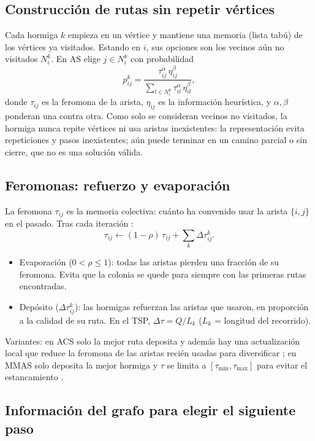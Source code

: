 \subsection{Construcción de rutas sin repetir vértices}

Cada hormiga $k$ empieza en un vértice y mantiene una memoria (lista tabú) de los
vértices ya visitados. Estando en $i$, sus opciones son los vecinos aún no visitados
$N_i^k$. En AS elige $j\in N_i^k$ con probabilidad \cite{aco1,aco3}
\[
  p_{ij}^{k}=\frac{\tau_{ij}^{\alpha}\,\eta_{ij}^{\beta}}
                  {\sum_{l\in N_i^k}\tau_{il}^{\alpha}\,\eta_{il}^{\beta}},
\]
donde $\tau_{ij}$ es la feromona de la arista, $\eta_{ij}$ es la información heurística,
y $\alpha,\beta$ ponderan una contra otra. Como solo se consideran vecinos no visitados,
la hormiga nunca repite vértices ni usa aristas inexistentes: la representación
evita repeticiones y pasos inexistentes; aún puede terminar en un camino parcial o sin cierre, que no es una solución válida.

\subsection{Feromonas: refuerzo y evaporación}

La feromona $\tau_{ij}$ es la memoria colectiva: cuánto ha convenido usar la arista
$\{i,j\}$ en el pasado. Tras cada iteración \cite{aco1,aco3}:
\[
  \tau_{ij}\leftarrow(1-\rho)\,\tau_{ij}+\sum_{k}\Delta\tau_{ij}^{k}.
\]
\begin{itemize}[nosep]
  \item Evaporación ($0<\rho\le1$): todas las aristas pierden una fracción de su
        feromona. Evita que la colonia se quede para siempre con las primeras rutas
        encontradas.
  \item Depósito ($\Delta\tau_{ij}^k$): las hormigas refuerzan las aristas que
        usaron, en proporción a la calidad de su ruta. En el TSP, $\Delta\tau=Q/L_k$
        ($L_k$ = longitud del recorrido).
\end{itemize}
Variantes: en ACS solo la mejor ruta deposita y además hay una actualización local que
reduce la feromona de las aristas recién usadas para diversificar \cite{aco2}; en MMAS solo
deposita la mejor hormiga y $\tau$ se limita a $[\tau_{\min},\tau_{\max}]$ para evitar el
estancamiento \cite{aco13}.

\subsection{Información del grafo para elegir el siguiente paso}

